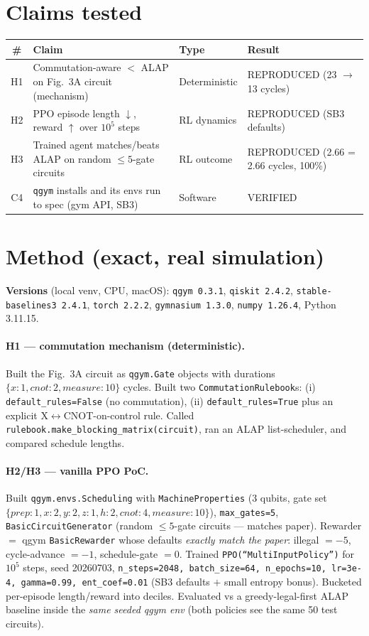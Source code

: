 \documentclass[11pt]{article}
\begin{document}
\section{Claims tested}
\begin{tabular}{clll}
\toprule
\# & Claim & Type & Result \\
\midrule
H1 & Commutation-aware $<$ ALAP on Fig.~3A circuit (mechanism) & Deterministic & REPRODUCED (23 $\to$ 13 cycles) \\
H2 & PPO episode length $\downarrow$, reward $\uparrow$ over $10^5$ steps & RL dynamics & REPRODUCED (SB3 defaults) \\
H3 & Trained agent matches/beats ALAP on random $\le 5$-gate circuits & RL outcome & REPRODUCED (2.66 = 2.66 cycles, 100\%) \\
C4 & \texttt{qgym} installs and its envs run to spec (gym API, SB3) & Software & VERIFIED \\
\bottomrule
\end{tabular}

\section{Method (exact, real simulation)}
\textbf{Versions} (local venv, CPU, macOS):
\texttt{qgym 0.3.1}, \texttt{qiskit 2.4.2}, \texttt{stable-baselines3 2.4.1},
\texttt{torch 2.2.2}, \texttt{gymnasium 1.3.0}, \texttt{numpy 1.26.4},
Python 3.11.15.

\paragraph{H1 --- commutation mechanism (deterministic).}
Built the Fig.~3A circuit as \texttt{qgym.Gate} objects with durations
$\{x{:}1, cnot{:}2, measure{:}10\}$ cycles. Built two
\texttt{CommutationRulebook}s: (i) \texttt{default\_rules=False} (no
commutation), (ii) \texttt{default\_rules=True} plus an explicit
X$\leftrightarrow$CNOT-on-control rule. Called
\texttt{rulebook.make\_blocking\_matrix(circuit)}, ran an ALAP list-scheduler,
and compared schedule lengths.

\paragraph{H2/H3 --- vanilla PPO PoC.}
Built \texttt{qgym.envs.Scheduling} with \texttt{MachineProperties}
(3 qubits, gate set $\{prep{:}1, x{:}2, y{:}2, z{:}1, h{:}2, cnot{:}4, measure{:}10\}$),
\texttt{max\_gates=5}, \texttt{BasicCircuitGenerator} (random $\le 5$-gate
circuits — matches paper). Rewarder $=$ qgym \texttt{BasicRewarder} whose
defaults \emph{exactly match the paper}: illegal $=-5$, cycle-advance $=-1$,
schedule-gate $=0$. Trained \texttt{PPO(``MultiInputPolicy'')} for $10^5$ steps,
seed 20260703, \texttt{n\_steps=2048, batch\_size=64, n\_epochs=10,
lr=3e-4, gamma=0.99, ent\_coef=0.01} (SB3 defaults $+$ small entropy bonus).
Bucketed per-episode length/reward into deciles. Evaluated vs a greedy-legal-first
ALAP baseline inside the \emph{same seeded qgym env} (both policies see the
same 50 test circuits).
\end{document}
